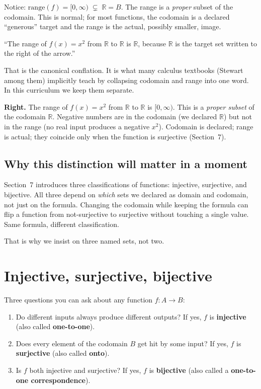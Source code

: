 Notice: $\mathrm{range}(f) = [0, \infty) \;\subsetneq\; \mathbb{R} = B$. The range is a \emph{proper} subset of the codomain. This is normal; for most functions, the codomain is a declared ``generous'' target and the range is the actual, possibly smaller, image.

\begin{mistake}
``The range of $f(x) = x^2$ from $\mathbb{R}$ to $\mathbb{R}$ is $\mathbb{R}$, because $\mathbb{R}$ is the target set written to the right of the arrow.''

That is the canonical conflation. It is what many calculus textbooks (Stewart among them) implicitly teach by collapsing codomain and range into one word. In this curriculum we keep them separate.

\textbf{Right.} The range of $f(x) = x^2$ from $\mathbb{R}$ to $\mathbb{R}$ is $[0, \infty)$. This is a \emph{proper subset} of the codomain $\mathbb{R}$. Negative numbers are in the codomain (we declared $\mathbb{R}$) but not in the range (no real input produces a negative $x^2$). Codomain is declared; range is actual; they coincide only when the function is surjective (Section~7).
\end{mistake}

\subsection*{Why this distinction will matter in a moment}

Section~7 introduces three classifications of functions: injective, surjective, and bijective. All three depend on \emph{which} sets we declared as domain and codomain, not just on the formula. Changing the codomain while keeping the formula can flip a function from not-surjective to surjective without touching a single value. Same formula, different classification.

That is why we insist on three named sets, not two.


\section{Injective, surjective, bijective}

Three questions you can ask about any function $f : A \to B$:

\begin{enumerate}
  \item Do different inputs always produce different outputs? If yes, $f$ is \textbf{injective} (also called \textbf{one-to-one}).
  \item Does every element of the codomain $B$ get hit by some input? If yes, $f$ is \textbf{surjective} (also called \textbf{onto}).
  \item Is $f$ both injective and surjective? If yes, $f$ is \textbf{bijective} (also called a \textbf{one-to-one correspondence}).
\end{enumerate}

